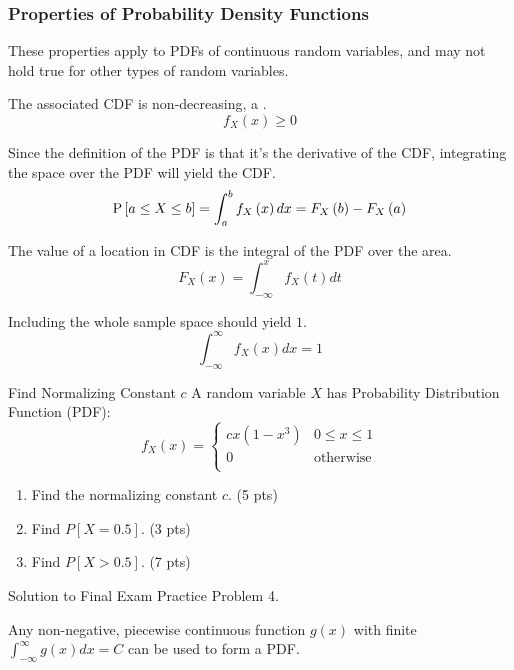 \subsubsection{Properties of Probability Density Functions}\label{subsubsec:Properties of Probability Density Functions}
These properties apply to PDFs of continuous random variables, and may not hold true for other types of random variables.
\begin{propertylist}
\item The associated CDF is non-decreasing, a .
  \begin{equation}
    f_{X} \left( x \right) \geq 0
  \end{equation}
\item Since the definition of the PDF is that it's the derivative of the CDF, integrating the space over the PDF will yield the CDF.
  \begin{equation}
    \operatorname{\operatorname{P}} \left[ a \leq X \leq b \right] = \int_{a}^{b} f_{X} \left( x \right) dx = F_{X} \left( b \right) - F_{X} \left( a \right)
  \end{equation}
\item The value of a location in CDF is the integral of the PDF over the area.
  \begin{equation}
    F_{X} \left( x \right) = \int_{-\infty}^{x} f_{X} \left( t \right) dt
  \end{equation}
\item Including the whole sample space should yield $1$.
  \begin{equation}
    \int_{-\infty}^{\infty} f_{X} \left( x \right) dx = 1
  \end{equation}
\end{propertylist}
\begin{example}{Find Normalizing Constant $c$}
  A random variable $X$ has Probability Distribution Function (PDF):
  \begin{equation*}
    f_{X}\left( x \right) = \begin{cases}
      cx \left( 1- x^{3} \right) & 0 \leq x \leq 1 \\
      0 & \text{otherwise} \\
    \end{cases}
  \end{equation*}
  \begin{enumerate}
  \item Find the normalizing constant $c$. (5 pts)
  \item Find $P \left[ X = 0.5 \right]$. (3 pts)
  \item Find $P \left[ X > 0.5 \right]$. (7 pts)
  \end{enumerate}

  \tcblower

  Solution to Final Exam Practice Problem 4.
\end{example}
\begin{remark*}
  Any non-negative, piecewise continuous function $g \left( x \right)$ with finite $\int_{-\infty}^{\infty} g \left( x \right) dx = C$ can be used to form a PDF.
\end{remark*}


